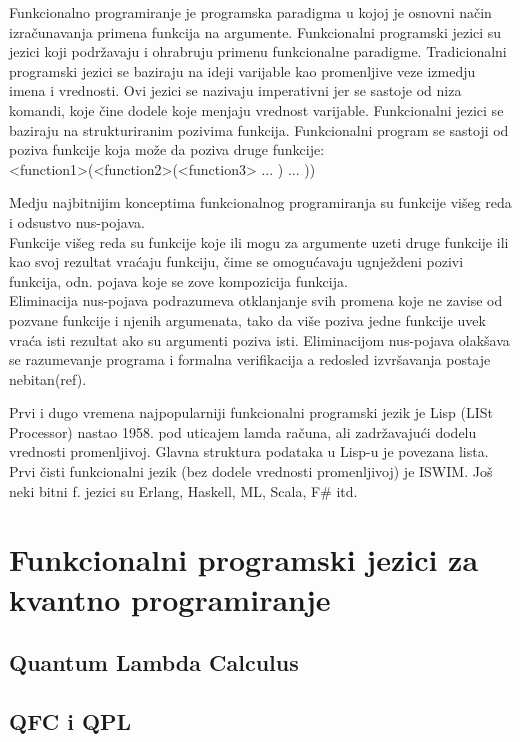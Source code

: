 \documentclass[a4paper]{article}
\begin{document}
{Funkcionalno programiranje je programska paradigma u kojoj je osnovni način izračunavanja primena funkcija na argumente.
Funkcionalni programski jezici su jezici koji podržavaju i ohrabruju primenu funkcionalne paradigme.
Tradicionalni programski jezici se baziraju na ideji varijable kao promenljive veze izmedju imena i vrednosti. Ovi jezici se nazivaju 
imperativni jer se sastoje od niza komandi, koje čine dodele koje menjaju vrednost varijable.
Funkcionalni jezici se baziraju na strukturiranim pozivima funkcija. Funkcionalni program se sastoji od poziva funkcije koja može da
poziva druge funkcije:\\
<function1>(<function2>(<function3> ... ) ... ))

Medju najbitnijim konceptima funkcionalnog programiranja su funkcije višeg reda i odsustvo nus-pojava. \\
Funkcije višeg reda su funkcije koje ili mogu za argumente uzeti druge funkcije ili kao svoj rezultat vraćaju funkciju, čime se omogućavaju ugnježdeni pozivi funkcija, odn. pojava koje se zove kompozicija funkcija.\\
Eliminacija nus-pojava podrazumeva otklanjanje svih promena koje ne zavise od pozvane funkcije i njenih argumenata, tako da više poziva jedne funkcije uvek vraća isti rezultat ako su argumenti poziva isti. Eliminacijom nus-pojava olakšava se razumevanje programa i formalna 
verifikacija a redosled izvršavanja postaje nebitan(ref).\par
Prvi i dugo vremena najpopularniji funkcionalni programski jezik je Lisp (LISt Processor) nastao 1958. pod uticajem lamda računa, ali 
zadržavajući dodelu vrednosti promenljivoj. Glavna struktura podataka u Lisp-u je povezana lista. Prvi čisti funkcionalni jezik 
(bez dodele vrednosti promenljivoj) je ISWIM. Još neki bitni f. jezici su Erlang, Haskell, ML, Scala, F\# itd.

\section{Funkcionalni programski jezici za kvantno programiranje}
\label{sec:funcprl_qp}


\subsection{Quantum Lambda Calculus}
\label{sec:lambdacalc}


\subsection{QFC i QPL}
\label{sec:qfc_qml}

}
\end{document}
